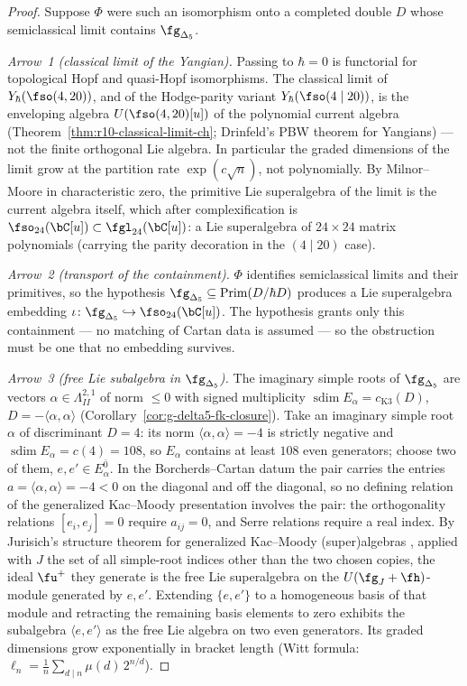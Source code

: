 \begin{proof}
Suppose $\Phi$ were such an isomorphism onto a completed double $D$
whose semiclassical limit contains $\fg_{\Delta_5}$.

\emph{Arrow~1 (classical limit of the Yangian).}
Passing to $\hbar = 0$ is functorial for topological Hopf and
quasi-Hopf isomorphisms. The classical limit of
$Y_\hbar(\fso(4,20))$, and of the Hodge-parity variant
$Y_\hbar(\fso(4 \mid 20))$, is the enveloping algebra
$U(\fso(4,20)[u])$ of the polynomial current algebra
(Theorem~\ref{thm:r10-classical-limit-ch}; Drinfeld's PBW theorem
for Yangians) --- not the finite orthogonal Lie algebra. In
particular the graded dimensions of the limit grow at the partition
rate $\exp(c\sqrt{n})$, not polynomially. By Milnor--Moore in
characteristic zero, the primitive Lie superalgebra of the limit is
the current algebra itself, which after complexification is
$\fso_{24}(\bC[u]) \subset \fgl_{24}(\bC[u])$: a Lie superalgebra of
$24 \times 24$ matrix polynomials (carrying the parity decoration in
the $(4 \mid 20)$ case).

\emph{Arrow~2 (transport of the containment).}
$\Phi$ identifies semiclassical limits and their primitives, so the
hypothesis
$\fg_{\Delta_5} \subseteq \operatorname{Prim}(D/\hbar D)$ produces a
Lie superalgebra embedding
$\iota \colon \fg_{\Delta_5} \hookrightarrow \fso_{24}(\bC[u])$. The
hypothesis grants only this containment --- no matching of Cartan
data is assumed --- so the obstruction must be one that no embedding
survives.

\emph{Arrow~3 (free Lie subalgebra in $\fg_{\Delta_5}$).}
The imaginary simple roots of $\fg_{\Delta_5}$ are vectors
$\alpha \in \Lambda^{2,1}_{II}$ of norm $\leq 0$ with signed
multiplicity $\operatorname{sdim} E_\alpha = c_{\mathrm{K3}}(D)$,
$D = -\langle\alpha,\alpha\rangle$
(Corollary~\ref{cor:g-delta5-fk-closure}). Take an imaginary simple
root $\alpha$ of discriminant $D = 4$: its norm
$\langle\alpha,\alpha\rangle = -4$ is strictly negative and
$\operatorname{sdim} E_\alpha = c(4) = 108$, so $E_\alpha$ contains
at least $108$ even generators; choose two of them,
$e, e' \in E_\alpha^{\bar 0}$. In the Borcherds--Cartan datum the
pair carries the entries
$a = \langle\alpha,\alpha\rangle = -4 < 0$ on the diagonal and off
the diagonal, so no defining relation of the generalized Kac--Moody
presentation involves the pair: the orthogonality relations
$[e_i, e_j] = 0$ require $a_{ij} = 0$, and Serre relations require a
real index. By Jurisich's structure theorem for generalized
Kac--Moody (super)algebras \cite{Jurisich96,Jurisich98}, applied
with $J$ the set of all simple-root indices other than the two
chosen copies, the ideal $\fu^+$ they generate is the free Lie
superalgebra on the $U(\fg_J + \fh)$-module generated by $e, e'$.
Extending $\{e, e'\}$ to a homogeneous basis of that module and
retracting the remaining basis elements to zero exhibits the
subalgebra $\langle e, e' \rangle$ as the free Lie algebra on two
even generators. Its graded dimensions grow exponentially in bracket
length (Witt formula:
$\ell_n = \tfrac{1}{n}\sum_{d \mid n} \mu(d)\,2^{n/d}$).


\end{proof}
